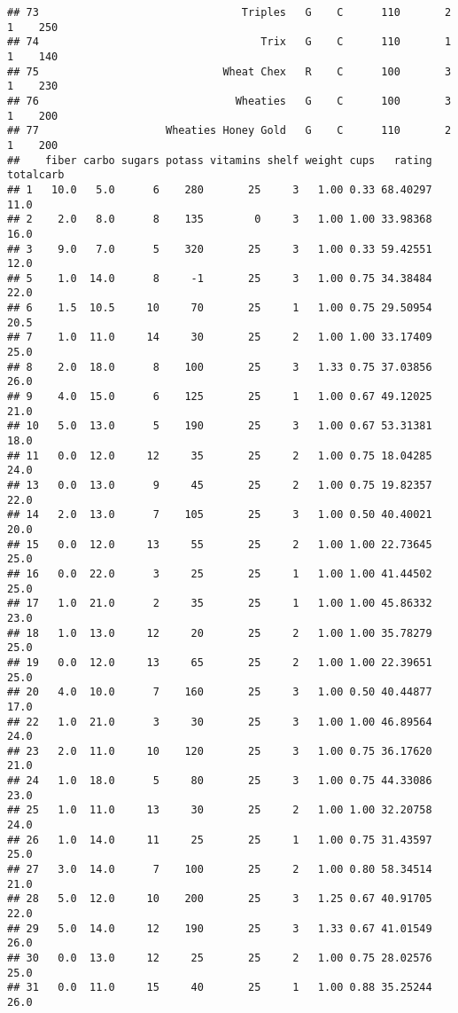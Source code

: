 \documentclass[
]{article}
\begin{document}
\begin{verbatim}
## 73                                Triples   G    C      110       2   1    250
## 74                                   Trix   G    C      110       1   1    140
## 75                             Wheat Chex   R    C      100       3   1    230
## 76                               Wheaties   G    C      100       3   1    200
## 77                    Wheaties Honey Gold   G    C      110       2   1    200
##    fiber carbo sugars potass vitamins shelf weight cups   rating totalcarb
## 1   10.0   5.0      6    280       25     3   1.00 0.33 68.40297      11.0
## 2    2.0   8.0      8    135        0     3   1.00 1.00 33.98368      16.0
## 3    9.0   7.0      5    320       25     3   1.00 0.33 59.42551      12.0
## 5    1.0  14.0      8     -1       25     3   1.00 0.75 34.38484      22.0
## 6    1.5  10.5     10     70       25     1   1.00 0.75 29.50954      20.5
## 7    1.0  11.0     14     30       25     2   1.00 1.00 33.17409      25.0
## 8    2.0  18.0      8    100       25     3   1.33 0.75 37.03856      26.0
## 9    4.0  15.0      6    125       25     1   1.00 0.67 49.12025      21.0
## 10   5.0  13.0      5    190       25     3   1.00 0.67 53.31381      18.0
## 11   0.0  12.0     12     35       25     2   1.00 0.75 18.04285      24.0
## 13   0.0  13.0      9     45       25     2   1.00 0.75 19.82357      22.0
## 14   2.0  13.0      7    105       25     3   1.00 0.50 40.40021      20.0
## 15   0.0  12.0     13     55       25     2   1.00 1.00 22.73645      25.0
## 16   0.0  22.0      3     25       25     1   1.00 1.00 41.44502      25.0
## 17   1.0  21.0      2     35       25     1   1.00 1.00 45.86332      23.0
## 18   1.0  13.0     12     20       25     2   1.00 1.00 35.78279      25.0
## 19   0.0  12.0     13     65       25     2   1.00 1.00 22.39651      25.0
## 20   4.0  10.0      7    160       25     3   1.00 0.50 40.44877      17.0
## 22   1.0  21.0      3     30       25     3   1.00 1.00 46.89564      24.0
## 23   2.0  11.0     10    120       25     3   1.00 0.75 36.17620      21.0
## 24   1.0  18.0      5     80       25     3   1.00 0.75 44.33086      23.0
## 25   1.0  11.0     13     30       25     2   1.00 1.00 32.20758      24.0
## 26   1.0  14.0     11     25       25     1   1.00 0.75 31.43597      25.0
## 27   3.0  14.0      7    100       25     2   1.00 0.80 58.34514      21.0
## 28   5.0  12.0     10    200       25     3   1.25 0.67 40.91705      22.0
## 29   5.0  14.0     12    190       25     3   1.33 0.67 41.01549      26.0
## 30   0.0  13.0     12     25       25     2   1.00 0.75 28.02576      25.0
## 31   0.0  11.0     15     40       25     1   1.00 0.88 35.25244      26.0

\end{verbatim}
\end{document}
